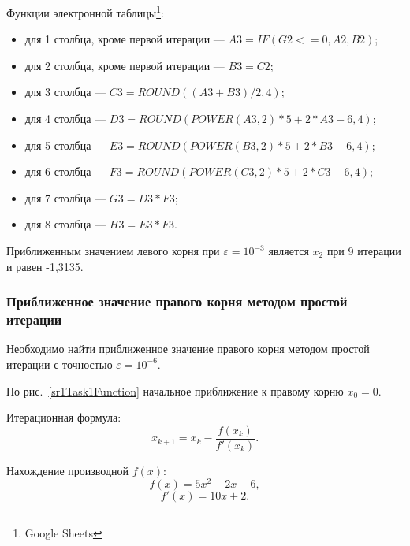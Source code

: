 \documentclass[10pt, a4paper, titlepage]{article}
\begin{document}
Функции электронной таблицы\footnote{Google Sheets}:
\begin{itemize}
    \item для 1 столбца, кроме первой итерации --- $A3=IF(G2<=0, A2, B2)$;
    
    \item для 2 столбца, кроме первой итерации --- $B3=C2$;
    
    \item для 3 столбца --- $C3=ROUND((A3+B3)/2, 4)$;
    
    \item для 4 столбца --- $D3=ROUND(POWER(A3, 2)*5+2*A3-6, 4)$;
    
    \item для 5 столбца --- $E3=ROUND(POWER(B3, 2)*5+2*B3-6, 4)$;
    
    \item для 6 столбца --- $F3=ROUND(POWER(C3, 2)*5+2*C3-6, 4)$;
    
    \item для 7 столбца --- $G3=D3*F3$;
    
    \item для 8 столбца --- $H3=E3*F3$.

\end{itemize}

Приближенным значением левого корня при $\varepsilon=10^{-3}$ является $x_2$ при 9 итерации и равен -1,3135.

\subsubsection{Приближенное значение правого корня методом простой итерации}

Необходимо найти приближенное значение правого корня методом простой итерации с точностью $\varepsilon=10^{-6}$.

По рис.~\ref{sr1Task1Function} начальное приближение к правому корню $x_0=0$.

Итерационная формула: $$x_{k+1}=x_k-\frac{f(x_k)}{f'(x_k)}.$$

Нахождение производной $f(x)$:
$$f(x)=5x^2+2x-6,$$
$$f'(x)=10x+2.$$
\end{document}
